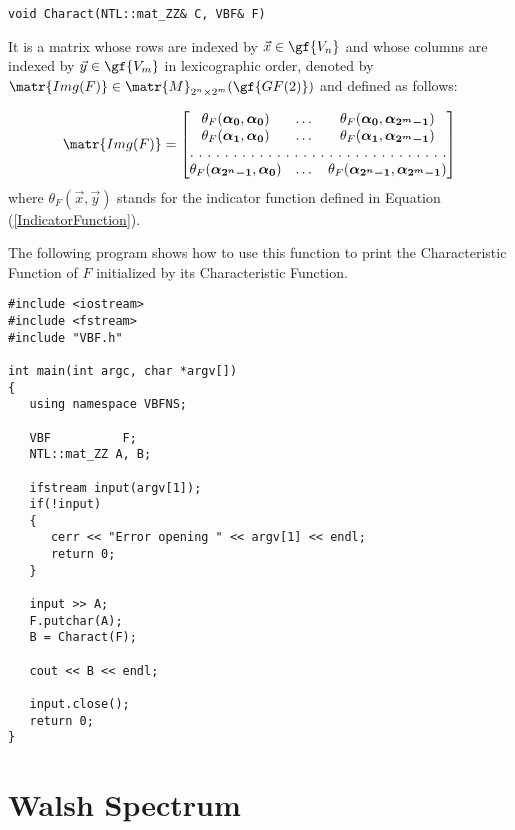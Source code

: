 \begin{verbatim}
void Charact(NTL::mat_ZZ& C, VBF& F)
\end{verbatim}

It is a matrix whose rows are indexed by $\vec{x} \in \gf{V_n}$ and whose columns are indexed by $\vec{y} \in \gf{V_m}$ in lexicographic order, denoted by $\matr{Img(F)} \in \matr{M}_{2^n \times 2^m}(\gf{GF(2)})$ and defined as follows: 

\begin{equation}
\matr{Img(F)} = \begin{bmatrix}
  \theta_F(\boldsymbol{\alpha_0},\boldsymbol{\alpha_0})&\dots&\theta_F(\boldsymbol{\alpha_0},\boldsymbol{\alpha_{2^m-1}}) \\ 
\theta_F(\boldsymbol{\alpha_1},\boldsymbol{\alpha_0})&\dots&\theta_F(\boldsymbol{\alpha_1},\boldsymbol{\alpha_{2^m-1}})
\\ 
\hdotsfor[2]{3}\\
\theta_F(\boldsymbol{\alpha_{2^n-1}},\boldsymbol{\alpha_0})&\dots&\theta_F(\boldsymbol{\alpha_{2^n-1}},\boldsymbol{\alpha_{2^m-1}})
\\ 
\end{bmatrix}
\end{equation}
where $\theta_F(\vec{x},\vec{y})$ stands for the indicator function defined in Equation (\ref{IndicatorFunction}).

The following program shows how to use this function to print the Characteristic Function of $F$ initialized by its Characteristic Function.

\begin{verbatim}
#include <iostream>
#include <fstream>
#include "VBF.h"

int main(int argc, char *argv[])
{
   using namespace VBFNS;

   VBF          F;
   NTL::mat_ZZ A, B;

   ifstream input(argv[1]);
   if(!input)
   {
      cerr << "Error opening " << argv[1] << endl;
      return 0;
   }

   input >> A;
   F.putchar(A);
   B = Charact(F);

   cout << B << endl;

   input.close();
   return 0;
}
\end{verbatim}

\section{Walsh Spectrum}

